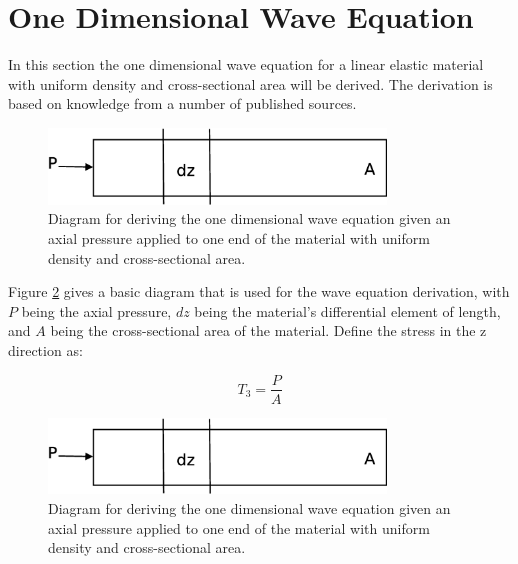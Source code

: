 \section{One Dimensional Wave Equation}

In this section the one dimensional wave equation for a linear elastic material with uniform density and cross-sectional area will be derived. The derivation is based on knowledge from a number of published sources.

\begin{figure}[ht!]
\centering
\includegraphics[width=0.8\textwidth]{eps_pics/deriveWaveRod}
\caption{Diagram for deriving the one dimensional wave equation given an axial pressure applied to one end of the material with uniform density and cross-sectional area.
	 \label{fig:deriveWaveRod}} 
\end{figure}

Figure \ref{fig:deriveWaveRod} gives a basic diagram that is used for the wave equation derivation, with $P$ being the axial pressure, $dz$ being the material's differential element of length, and $A$ being the cross-sectional area of the material. Define the stress in the z direction as:

\begin{equation}
T_3 = \frac{P}{A}
\end{equation}


\begin{figure}[ht!]
\centering
\includegraphics[width=0.8\textwidth]{eps_pics/deriveWaveRod}
\caption{Diagram for deriving the one dimensional wave equation given an axial pressure applied to one end of the material with uniform density and cross-sectional area.
	 \label{fig:deriveWaveRod}} 
\end{figure}